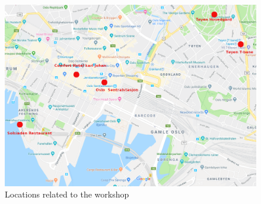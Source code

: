 \documentclass{article}
\begin{document}
\begin{figure}[h]
    \centering
    \includegraphics[scale=1.5]{img/annotated_map.png}
    \caption{Locations related to the workshop}
    \label{fig:Oslo}
\end{figure}
\end{document}
